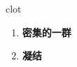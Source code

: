 
\begin{frame}
{\huge clot}
\begin{center}
\begin{enumerate}\Large
  \item \textbf{密集的一群}
  \item \textbf{凝结}
\end{enumerate}
\end{center}
\end{frame}
